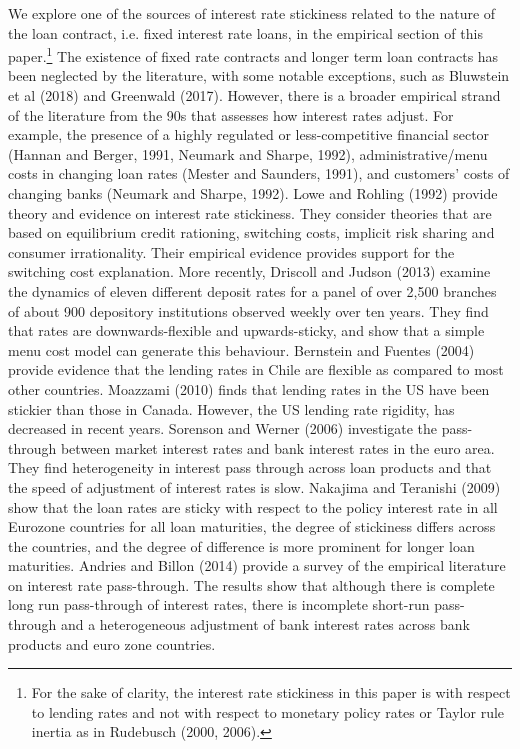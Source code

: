 \documentclass[12pt]{article}
\numberwithin{equation}{section}
\begin{document}
We explore one of the sources of interest rate stickiness related to the nature of the loan contract, i.e. fixed interest rate loans, in the empirical section of this paper.\footnote{For the sake of clarity, the interest rate stickiness in this paper is with respect to lending rates and not with respect to monetary policy rates or Taylor rule inertia as in Rudebusch (2000, 2006).}  The existence of fixed rate contracts and longer term loan contracts has been neglected by the literature, with some notable exceptions, such as Bluwstein et al (2018) and Greenwald (2017). However, there is a broader empirical strand of the literature from the 90s that assesses how interest rates adjust. For example, the presence of a highly regulated or less-competitive financial sector (Hannan and Berger, 1991, Neumark and Sharpe, 1992), administrative/menu costs in changing loan rates (Mester and Saunders, 1991), and customers’ costs of changing banks (Neumark and Sharpe, 1992). Lowe and Rohling (1992) provide theory and evidence on interest rate stickiness. They consider theories that are based on equilibrium credit rationing, switching costs, implicit risk sharing and consumer irrationality. Their empirical evidence provides support for the switching cost explanation. More recently, Driscoll and Judson (2013) examine the dynamics of eleven different deposit rates for a panel of over 2,500 branches of about 900 depository institutions observed weekly over ten years. They find that rates are downwards-flexible and upwards-sticky, and show that a simple menu cost model can generate this behaviour. Bernstein and Fuentes (2004) provide evidence that the lending rates in Chile are flexible as compared to most other countries. Moazzami (2010) finds that lending rates in the US have been stickier than those in Canada. However, the US lending rate rigidity, has decreased in recent years. Sorenson and Werner (2006) investigate the pass-through between market interest rates and bank interest rates in the euro area. They find heterogeneity in interest pass through across loan products and that the speed of adjustment of interest rates is slow. Nakajima and Teranishi (2009) show that the loan rates are sticky with respect to the policy interest rate in all Eurozone countries for all loan maturities, the degree of stickiness differs across the countries, and the degree of difference is more prominent for longer loan maturities. Andries and Billon (2014) provide a survey of the empirical literature on interest rate pass-through. The results show that although there is complete long run pass-through of interest rates, there is incomplete short-run pass-through and a heterogeneous adjustment of bank interest rates across bank products and euro zone countries.
\end{document}
